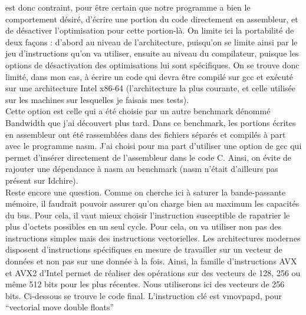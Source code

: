 \documentclass{report}
\begin{document}
est donc contraint, pour être certain que notre programme a bien le comportement désiré, d'écrire une
portion du code directement en assembleur, et de désactiver l'optimisation pour cette portion-là. On
limite ici la portabilité de deux façons : d'abord au niveau de l'architecture, puisqu'on se limite ainsi
par le jeu d'instructions qu'on va utiliser, ensuite au niveau du compilateur, puisque les options 
de désactivation des optimisations lui sont spécifiques. On se trouve donc limité, dans mon cas,
à écrire un code qui devra être compilé sur gcc et exécuté sur une architecture Intel x86-64 
(l'architecture la plus courante, et celle utilisée sur les machines sur lesquelles je faisais mes tests).
\\Cette option est celle qui a été choisie par un autre benchmark dénommé Bandwidth\cite{bandwidth} que 
j'ai découvert plus tard. Dans ce benchmark, les portions écrites en assembleur ont été rassemblées dans
des fichiers séparés et compilés à part avec le programme nasm. J'ai choisi pour ma part d'utiliser 
une option de gcc qui permet d'insérer directement de l'assembleur dans le code C. Ainsi, on évite
de rajouter une dépendance à nasm au benchmark (nasm n'était d'ailleurs pas présent sur Idchire).
\\Reste encore une question. Comme on cherche ici à saturer la bande-passante mémoire, il faudrait
pouvoir assurer qu'on charge bien au maximum les capacités du bus. Pour cela, il vaut mieux choisir
l'instruction susceptible de rapatrier le plus d'octets possibles en un seul cycle. Pour cela, on va 
utiliser non pas des instructions simples mais des instructions vectorielles. Les architectures modernes
disposent d'instructions spécifiques en mesure de travailler sur un vecteur de données et non pas sur
une donnée à la fois. Ainsi, la famille d'instructions AVX et AVX2 d'Intel permet de réaliser des 
opérations sur des vecteurs de 128, 256 ou même 512 bits pour les plus récentes. Nous utiliserons
ici des vecteurs de 256 bits. Ci-dessous se trouve le code final. L'instruction clé est vmovpapd, pour
``vectorial move double floats''
\end{document}
